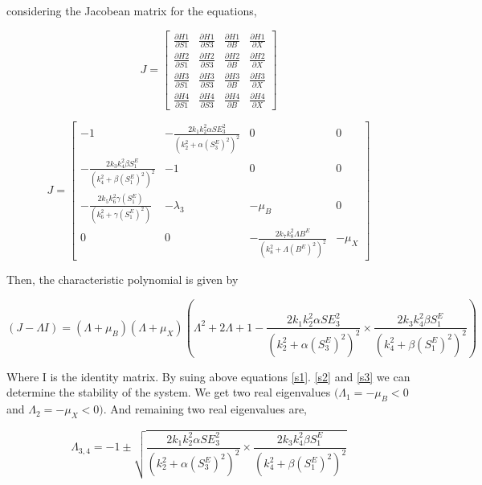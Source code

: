 considering the Jacobean matrix for the equations, 

\begin{equation}
\label{s1}
    J = \begin{bmatrix}
\frac{\partial H1}{\partial S1} & \frac{\partial H1}{\partial S3} & \frac{\partial H1}{\partial B} & \frac{\partial H1}{\partial X} \\
\frac{\partial H2}{\partial S1} & \frac{\partial H2}{\partial S3} & \frac{\partial H2}{\partial B} & \frac{\partial H2}{\partial X} \\
\frac{\partial H3}{\partial S1} & \frac{\partial H3}{\partial S3} & \frac{\partial H3}{\partial B} & \frac{\partial H3}{\partial X} \\
\frac{\partial H4}{\partial S1} & \frac{\partial H4}{\partial S3} & \frac{\partial H4}{\partial B} & \frac{\partial H4}{\partial X}
\end{bmatrix}
\end{equation}

\begin{equation}
\label{se2}
    J = \begin{bmatrix}
-1 & -\frac{2k_1k_2^2\alpha SE_3^2}{(k_2^2 + \alpha(S_3^E)^2)^2} & 0 & 0 \\
-\frac{2k_3k_4^2\beta S_1^E}{(k_4^2+\beta(S_1^E)^2)^2} & -1 & 0 & 0 \\
-\frac{2k_5k_6^2\gamma(S_1^E)}{(k_6^2+\gamma (S_1^E)^2)} & -\lambda_3 & -\mu_B & 0 \\
0 & 0 & -\frac{2k_7k_8^2\Lambda B^E}{(k_8^2+\Lambda(B^E)^2)^2} & -\mu_X
\end{bmatrix}
\end{equation}

Then, the characteristic polynomial is given by

\begin{equation}
\label{s3}
    (J - \Lambda I) = (\Lambda + \mu_B)(\Lambda + \mu_X) (\Lambda^2 + 2\Lambda +1 - \frac{2k_1k_2^2\alpha SE_3^2}{(k_2^2 + \alpha(S_3^E)^2)^2} \times \frac{2k_3k_4^2\beta S_1^E}{(k_4^2+\beta(S_1^E)^2)^2})
\end{equation}

Where I is the identity matrix. By suing above equations \eqref{s1}. \eqref{s2} and \eqref{s3} we can determine the stability of the system. We get two real eigenvalues $(\Lambda_1 = -\mu_B < 0$ and $\Lambda_2 = - \mu_X < 0)$. And remaining two real eigenvalues are,

\begin{equation}
    \Lambda_{3,4} = -1 \pm \sqrt{\frac{2k_1k_2^2\alpha SE_3^2}{(k_2^2 + \alpha(S_3^E)^2)^2} \times \frac{2k_3k_4^2\beta S_1^E}{(k_4^2+\beta(S_1^E)^2)^2}}
\end{equation}

